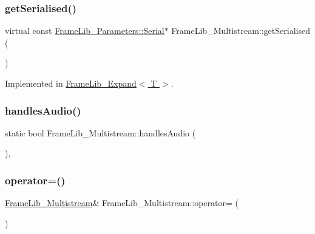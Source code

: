 \subsubsection{\texorpdfstring{get\+Serialised()}{getSerialised()}}
{\footnotesize\ttfamily virtual const \hyperlink{class_frame_lib___parameters_1_1_serial}{Frame\+Lib\+\_\+\+Parameters\+::\+Serial}$\ast$ Frame\+Lib\+\_\+\+Multistream\+::get\+Serialised (\begin{DoxyParamCaption}{ }\end{DoxyParamCaption})\hspace{0.3cm}{\ttfamily [pure virtual]}}



Implemented in \hyperlink{class_frame_lib___expand_a58eae43d3a0746f20a9d00e9c050b8c8}{Frame\+Lib\+\_\+\+Expand$<$ T $>$}.

\mbox{\label{class_frame_lib___multistream_a9e43977822d8e46d46e185452cdbd819}} 
\subsubsection{\texorpdfstring{handles\+Audio()}{handlesAudio()}}
{\footnotesize\ttfamily static bool Frame\+Lib\+\_\+\+Multistream\+::handles\+Audio (\begin{DoxyParamCaption}{ }\end{DoxyParamCaption})\hspace{0.3cm}{\ttfamily [inline]}, {\ttfamily [static]}}

\mbox{\label{class_frame_lib___multistream_a7f6e0b81b8789a5704224660265b4a51}} 
\subsubsection{\texorpdfstring{operator=()}{operator=()}}
{\footnotesize\ttfamily \hyperlink{class_frame_lib___multistream}{Frame\+Lib\+\_\+\+Multistream}\& Frame\+Lib\+\_\+\+Multistream\+::operator= (\begin{DoxyParamCaption}\item[{const \hyperlink{class_frame_lib___multistream}{Frame\+Lib\+\_\+\+Multistream} \&}]{ }\end{DoxyParamCaption})\hspace{0.3cm}{\ttfamily [delete]}}

